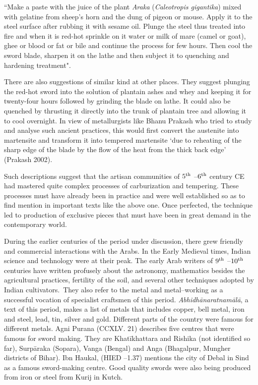 ``Make a paste with the juice of the plant {\it Araka} ({\it Caleotropis gigantika}) mixed with gelatine from sheep's horn and the dung of pigeon or mouse. Apply it to the steel surface after rubbing it with sesame oil. Plunge the steel thus treated into fire and when it is red-hot sprinkle on it water or milk of mare (camel or goat), ghee or blood or fat or bile and continue the process for few hours. Then cool the sword blade, sharpen it on the lathe and then subject it to quenching and hardening treatment".

There are also suggestions of similar kind at other places. They suggest plunging the red-hot sword into the solution of plantain ashes and whey and keeping it for twenty-four hours followed by grinding the blade on lathe. It could also be quenched by thrusting it directly into the trunk of plantain tree and allowing it to cool overnight. In view of metallurgists like Bhanu Prakash who tried to study and analyse such ancient practices, this would first convert the austenite into martensite and transform it into tempered martensite `due to reheating of the sharp edge of the blade by the flow of the heat from the thick back edge' (Prakash 2002).

Such descriptions suggest that the artisan communities of $5^{\rm th}$ –$6^{\rm th}$ century CE had mastered quite complex processes of carburization and tempering. These processes must have already been in practice and were well established so as to find mention in important texts like the above one. Once perfected, the technique led to production of exclusive pieces that must have been in great demand in the contemporary world. 

During the earlier centuries of the period under discussion, there grew friendly and commercial interactions with the Arabs. In the Early Medieval times, Indian science and technology were at their peak. The early Arab writers of $9^{\rm th}$ –$10^{\rm th}$ centuries have written profusely about the astronomy, mathematics besides the agricultural practices, fertility of the soil, and several other techniques adopted by Indian cultivators.~They also refer to the metal and metal–working as a successful vocation of specialist craftsmen of this period. \textit{Abhidhānaratnamālā}, a text of this period, makes a list of metals that includes copper, bell metal, iron and steel, lead, tin, silver and gold. Different parts of the country were famous for different metals. Agni Purana (CCXLV. 21) describes five centres that were famous for sword making. They are Khatīkhattara and Rishika (not identified so far), Surpāraka (Sopara), Vanga (Bengal) and Anga (Bhagalpur, Mungher districts of Bihar). Ibn Haukal, (HIED –1.37) mentions the city of Debal in Sind as a famous sword-making centre. Good quality swords were also being produced from iron or steel from Kurij in Kutch. 


